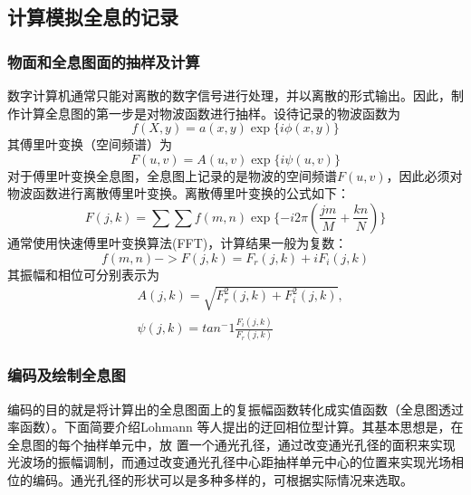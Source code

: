 \documentclass[10pt,a4paper,twocolumn,twoside,UTF8]{ctexart}
\begin{document}
	\subsection{计算模拟全息的记录}
		\subsubsection{物面和全息图面的抽样及计算}
		数字计算机通常只能对离散的数字信号进行处理，并以离散的形式输出。因此，制作计算全息图的第一步是对物波函数进行抽样。设待记录的物波函数为
		\begin{equation}
			f(X,y)=a(x,y)\exp\{i\phi(x,y)\}
		\end{equation}
		其傅里叶变换（空间频谱）为
		\begin{equation}
			F(u,v)=A(u,v)\exp\{i\psi(u,v)\}
		\end{equation}
		对于傅里叶变换全息图，全息图上记录的是物波的空间频谱$F(u,v)$，因此必须对物波函数进行离散傅里叶变换。离散傅里叶变换的公式如下：
		\begin{equation}
			F(j,k)=\sum\sum  f(m,n)\exp\{-i2\pi(\frac{jm}{M}+\frac{kn}{N})\}
		\end{equation}
		通常使用快速傅里叶变换算法(FFT)，计算结果一般为复数：
		\begin{equation}
			f(m,n)->F(j,k)=F_r(j,k)+iF_i(j,k)
		\end{equation}
		其振幅和相位可分别表示为
		\begin{equation}
			\begin{aligned}
			&A(j,k)=\sqrt{F_r^2(j,k)+F_i^2(j,k)},\\ &\psi(j,k)=tan^-1\frac{F_i(j,k)}{F_r(j,k)}
			\end{aligned}
		\end{equation}

		\subsubsection{编码及绘制全息图}
		编码的目的就是将计算出的全息图面上的复振幅函数转化成实值函数（全息图透过率函数）。下面简要介绍Lohmann 等人提出的迂回相位型计算。其基本思想是，在全息图的每个抽样单元中，放
		置一个通光孔径，通过改变通光孔径的面积来实现光波场的振幅调制，而通过改变通光孔径中心距抽样单元中心的位置来实现光场相位的编码。通光孔径的形状可以是多种多样的，可根据实际情况来选取。
\end{document}
